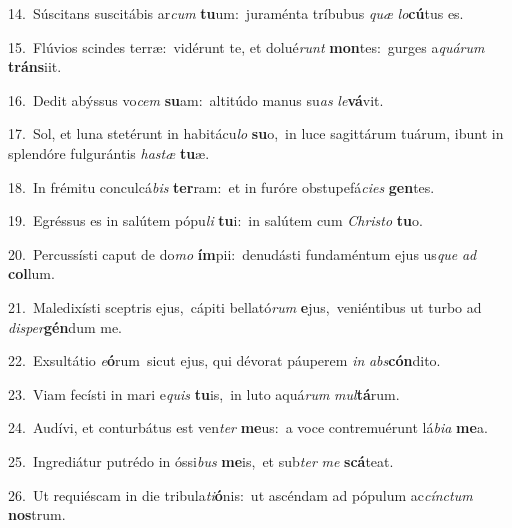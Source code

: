 {\numbfont\textcolor{\numbcolor}{14.}}~Súscitans suscitábis ar\textit{cum} \textbf{tu}\-um:~\star juraménta tríbubus \textit{quæ} \textit{lo}\-\textbf{cú}tus es.\par
{\numbfont\textcolor{\numbcolor}{15.}}~Flúvios scindes terræ:~\dagger vidérunt te, et dolué\textit{runt} \textbf{mon}\-tes:~\star gurges a\-\textit{quá}\-\textit{rum} \textbf{tráns}\-iit.\par
{\numbfont\textcolor{\numbcolor}{16.}}~Dedit abýssus vo\textit{cem} \textbf{su}\-am:~\star altitúdo manus su\textit{as} \textit{le}\-\textbf{vá}vit.\par
{\numbfont\textcolor{\numbcolor}{17.}}~Sol, et luna stetérunt in habitácu\textit{lo} \textbf{su}\-o,~\star in luce sagittárum tuárum, ibunt in splendóre fulgurántis \textit{has}\-\textit{tæ} \textbf{tu}\-æ.\par
{\numbfont\textcolor{\numbcolor}{18.}}~In frémitu conculcá\textit{bis} \textbf{ter}\-ram:~\star et in furóre obstupefá\-\textit{ci}\-\textit{es} \textbf{gen}\-tes.\par
{\numbfont\textcolor{\numbcolor}{19.}}~Egréssus es in salútem pópu\textit{li} \textbf{tu}\-i:~\star in salútem cum \textit{Chris}\-\textit{to} \textbf{tu}\-o.\par
{\numbfont\textcolor{\numbcolor}{20.}}~Percussísti caput de do\textit{mo} \textbf{ím}\-pii:~\star denudásti fundaméntum ejus us\textit{que} \textit{ad} \textbf{col}\-lum.\par
{\numbfont\textcolor{\numbcolor}{21.}}~Maledixísti sceptris ejus,~\dagger cápiti bellató\textit{rum} \textbf{e}\-jus,~\star veniéntibus ut turbo ad \textit{di}\-\textit{sper}\textbf{gén}dum me.\par
{\numbfont\textcolor{\numbcolor}{22.}}~Exsultátio \textit{e}\-\textbf{ó}rum~\star sicut ejus, qui dévorat páuperem \textit{in} \textit{abs}\-\textbf{cón}dito.\par
{\numbfont\textcolor{\numbcolor}{23.}}~Viam fecísti in mari e\textit{quis} \textbf{tu}\-is,~\star in luto aquá\textit{rum} \textit{mul}\-\textbf{tá}rum.\par
{\numbfont\textcolor{\numbcolor}{24.}}~Audívi, et conturbátus est ven\textit{ter} \textbf{me}\-us:~\star a voce contremuérunt lá\-\textit{bi}\-\textit{a} \textbf{me}\-a.\par
{\numbfont\textcolor{\numbcolor}{25.}}~Ingrediátur putrédo in óssi\textit{bus} \textbf{me}\-is,~\star et sub\textit{ter} \textit{me} \textbf{scá}\-teat.\par
{\numbfont\textcolor{\numbcolor}{26.}}~Ut requiéscam in die tribula\-\textit{ti}\-\textbf{ó}nis:~\star ut ascéndam ad pópulum ac\-\textit{cínc}\-\textit{tum} \textbf{nos}\-trum.\par
